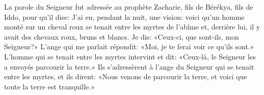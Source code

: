 La parole du Seigneur fut adressée au prophète Zacharie,
	fils de Bérékya, fils de Iddo, pour qu’il dise:
	J’ai eu, pendant la nuit, une vision:
	voici qu’un homme monté sur un cheval roux se tenait entre les myrtes de l’abîme
	et, derrière lui, il y avait des chevaux roux, bruns et blancs.
Je dis: «Ceux-ci, que sont-ils, mon Seigneur?»
	L’ange qui me parlait répondit:
	«Moi, je te ferai voir ce qu’ils sont.»
L’homme qui se tenait entre les myrtes intervint et dit:
	«Ceux-là, le Seigneur les a envoyés parcourir la terre.»
Ils s’adressèrent à l’ange du Seigneur qui se tenait entre les myrtes, et ils dirent:
	«Nous venons de parcourir la terre, et voici que toute la terre est tranquille.»
